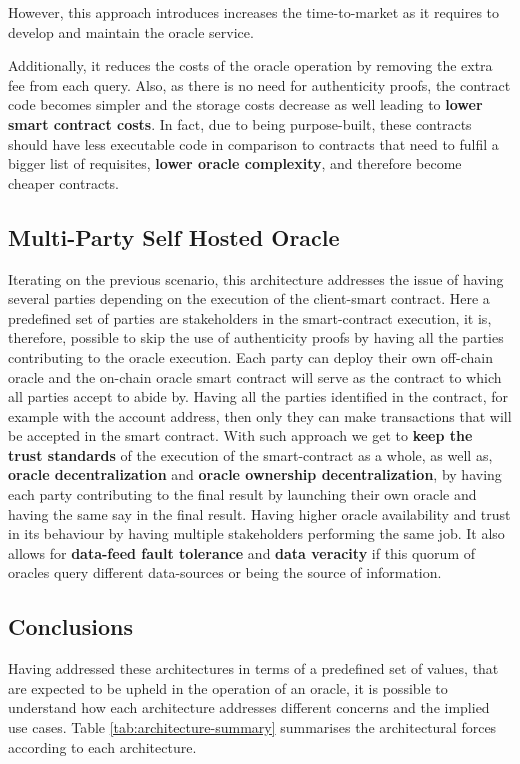 However, this approach introduces increases the time-to-market as it requires to develop and maintain the oracle service.

Additionally, it reduces the costs of the oracle operation by removing the extra fee from each query. Also, as there is no need for authenticity proofs, the contract code becomes simpler and the storage costs decrease as well leading to \textbf{lower smart contract costs}. In fact, due to being purpose-built, these contracts should have less executable code in comparison to contracts that need to fulfil a bigger list of requisites, \textbf{lower oracle complexity}, and therefore become cheaper contracts.

\subsection{Multi-Party Self Hosted Oracle}\label{MP-SHO}
Iterating on the previous scenario, this architecture addresses the issue of having several parties depending on the execution of the client-smart contract. Here a predefined set of parties are stakeholders in the smart-contract execution, it is, therefore, possible to skip the use of authenticity proofs by having all the parties contributing to the oracle execution. Each party can deploy their own off-chain oracle and the on-chain oracle smart contract will serve as the contract to which all parties accept to abide by. Having all the parties identified in the contract, for example with the account address, then only they can make transactions that will be accepted in the smart contract. With such approach we get to \textbf{keep the trust standards} of the execution of the smart-contract as a whole, as well as, \textbf{oracle decentralization} and \textbf{oracle ownership decentralization}, by having each party contributing to the final result by launching their own oracle and having the same say in the final result. Having higher oracle availability and trust in its behaviour by having multiple stakeholders performing the same job. It also allows for \textbf{data-feed fault tolerance} and \textbf{data veracity} if this quorum of oracles query different data-sources or being the source of information.

\subsection{Conclusions}
Having addressed these architectures in terms of a predefined set of values, that are expected to be upheld in the operation of an oracle, it is possible to understand how each architecture addresses different concerns and the implied use cases. Table \ref{tab:architecture-summary} summarises the architectural forces according to each architecture.


